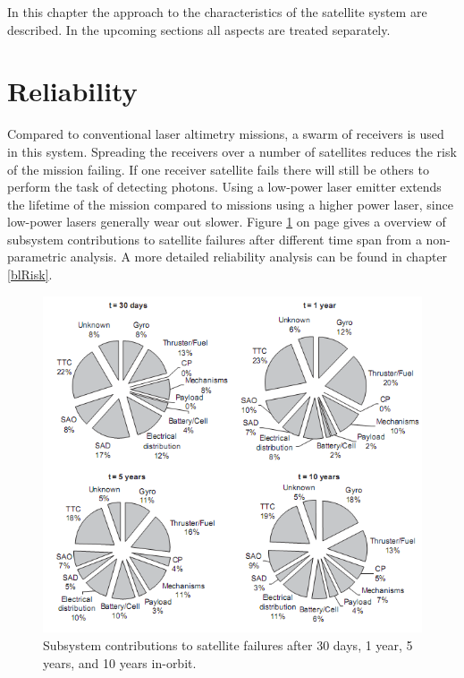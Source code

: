 
In this chapter the approach to the  characteristics of the satellite system are described. In the upcoming sections all aspects are treated separately. 

\section{Reliability}
\label{blRAMSrel}
Compared to conventional laser altimetry missions, a swarm of receivers is used in this system. Spreading the receivers over a number of satellites reduces the risk of the mission failing. If one receiver satellite fails there will still be others to perform the task of detecting photons. Using a low-power laser emitter extends the lifetime of the mission compared to missions using a higher power laser, since low-power lasers generally wear out slower. Figure \ref{R} on page \pageref{R} gives a overview of subsystem contributions to satellite failures after different time span from a non-parametric analysis. A more detailed reliability analysis can be found in chapter \ref{blRisk}.
\begin{figure} [H]
	\begin{center}
         \includegraphics[scale=1]{chapters/img/subsystem_reliability_analysis.png}
	
	\caption{Subsystem contributions to satellite failures after 30 days, 1 year, 5 years, and 10 years in-orbit.\cite{reliability}}
	\label{R}
	\end{center}
	\end{figure}

